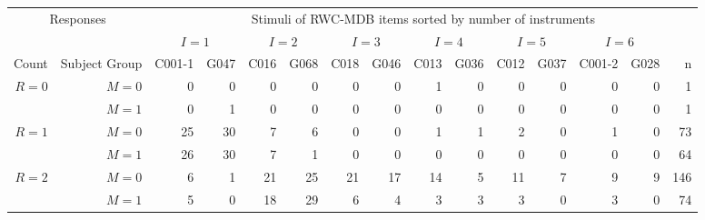 \begin{table}
\begin{center}
\tiny
\begin{tabular}{rrrrrrrrrrrrrrr}
\toprule[1.5pt]
\multicolumn{ 2}{c}{Responses} & \multicolumn{ 13}{c}{Stimuli of RWC-MDB items sorted by number of instruments} \\ 
 \cmidrule(r){1-2} \cmidrule(l){3-15}
 &  & \multicolumn{2}{c}{$I=1$} 
	& \multicolumn{2}{c}{$I=2$} 
	& \multicolumn{2}{c}{$I=3$} 
	& \multicolumn{2}{c}{$I=4$} 
	& \multicolumn{2}{c}{$I=5$} 
	& \multicolumn{2}{c}{$I=6$} 
	& \multicolumn{1}{l}{} \\ 
\cmidrule(r){3-4} \cmidrule(lr){5-6} \cmidrule(lr){7-8} \cmidrule(lr){9-10} \cmidrule(lr){11-12} \cmidrule(l){13-14}
Count & Subject Group &  C001-1 & G047 & C016 & G068 & C018 & G046 & C013 & G036 & C012 & G037 & C001-2 & G028 & n \\ 
\midrule

\multirow{2}{*}{$R=0$} & $M=0$ & 0 & 0 & 0 & 0 & 0 & 0 & 1 & 0 & 0 & 0 & 0 & 0 & 1 \\ 
 & $M=1$ & 0 & 1 & 0 & 0 & 0 & 0 & 0 & 0 & 0 & 0 & 0 & 0 & 1 \\ 

\midrule
\multirow{2}{*}{$R=1$} & $M=0$ & \cellcolor[gray]{0.9} 25 & \cellcolor[gray]{0.9} 30 & 7 & 6 & 0 & 0 & 1 & 1 & 2 & 0 & 1 & 0 & 73 \\ 
 & $M=1$ & \cellcolor[gray]{0.9} 26 & \cellcolor[gray]{0.9} 30 & 7 & 1 & 0 & 0 & 0 & 0 & 0 & 0 & 0 & 0 & 64 \\ 

\midrule
\multirow{2}{*}{$R=2$} & $M=0$ & 6 & 1 & \cellcolor[gray]{0.9} 21 & \cellcolor[gray]{0.9} 25 & 21 & 17 & 14 & 5 & 11 & 7 & 9 & 9 & 146 \\ 
 & $M=1$ & 5 & 0 & \cellcolor[gray]{0.9} 18 & \cellcolor[gray]{0.9} 29 & 6 & 4 & 3 & 3 & 3 & 0 & 3 & 0 & 74 \\ 


\end{tabular}
\end{center}
\end{table}
